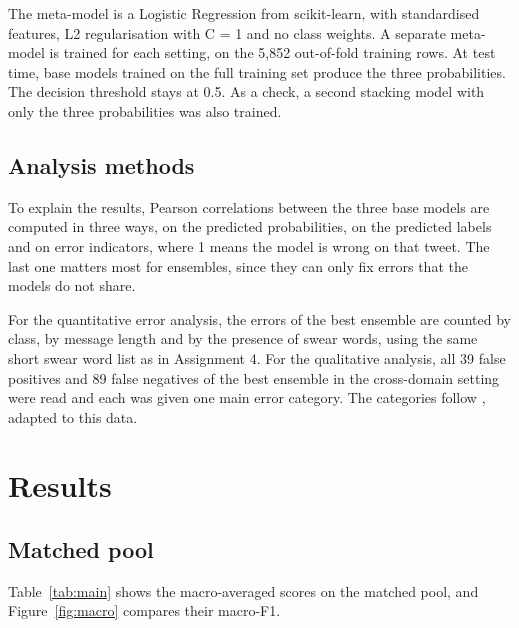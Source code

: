 \documentclass[11pt,a4paper]{article}
\begin{document}
The meta-model is a Logistic Regression from scikit-learn, with standardised features, L2 regularisation with C = 1 and no class weights. A separate meta-model is trained for each setting, on the 5,852 out-of-fold training rows. At test time, base models trained on the full training set produce the three probabilities. The decision threshold stays at 0.5. As a check, a second stacking model with only the three probabilities was also trained.

\subsection{Analysis methods}

To explain the results, Pearson correlations between the three base models are computed in three ways, on the predicted probabilities, on the predicted labels and on error indicators, where 1 means the model is wrong on that tweet. The last one matters most for ensembles, since they can only fix errors that the models do not share.

For the quantitative error analysis, the errors of the best ensemble are counted by class, by message length and by the presence of swear words, using the same short swear word list as in Assignment 4. For the qualitative analysis, all 39 false positives and 89 false negatives of the best ensemble in the cross-domain setting were read and each was given one main error category. The categories follow \citet{vanaken2018challenges}, adapted to this data.

\section{Results}
\label{sec:results}

\subsection{Matched pool}

Table~\ref{tab:main} shows the macro-averaged scores on the matched pool, and Figure~\ref{fig:macro} compares their macro-F1.
\end{document}
